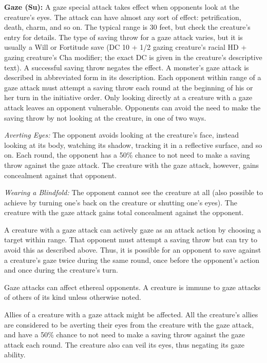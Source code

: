 \documentclass{article}
\begin{document}
\vspace{12pt}
\textbf{Gaze (Su):} A gaze special attack takes effect when opponents look at the 
creature's eyes. The attack can have almost any sort of effect: petrification, 
death, charm, and so on. The typical range is 30 feet, but check the creature's 
entry for details. The type of saving throw for a gaze attack varies, but it is 
usually a Will or Fortitude save (DC 10 + 1/2 gazing creature's racial HD + gazing 
creature's Cha modifier; the exact DC is given in the creature's descriptive text). 
A successful saving throw negates the effect. A monster's gaze attack is described 
in abbreviated form in its description. Each opponent within range of a gaze attack 
must attempt a saving throw each round at the beginning of his or her turn in the 
initiative order. Only looking directly at a creature with a gaze attack leaves 
an opponent vulnerable. Opponents can avoid the need to make the saving throw by 
not looking at the creature, in one of two ways. 

\textit{Averting Eyes: }The opponent avoids looking at the creature's face, instead 
looking at its body, watching its shadow, tracking it in a reflective surface, 
and so on. Each round, the opponent has a 50\% chance to not need to make a saving 
throw against the gaze attack. The creature with the gaze attack, however, gains 
concealment against that opponent.

\textit{Wearing a Blindfold: }The opponent cannot see the creature at all (also 
possible to achieve by turning one's back on the creature or shutting one's eyes). 
The creature with the gaze attack gains total concealment against the opponent. 

A creature with a gaze attack can actively gaze as an attack action by choosing 
a target within range. That opponent must attempt a saving throw but can try to 
avoid this as described above. Thus, it is possible for an opponent to save against 
a creature's gaze twice during the same round, once before the opponent's action 
and once during the creature's turn. 

Gaze attacks can affect ethereal opponents. A creature is immune to gaze attacks 
of others of its kind unless otherwise noted.

Allies of a creature with a gaze attack might be affected. All the creature's allies 
are considered to be averting their eyes from the creature with the gaze attack, 
and have a 50\% chance to not need to make a saving throw against the gaze attack 
each round. The creature also can veil its eyes, thus negating its gaze ability.
\end{document}
